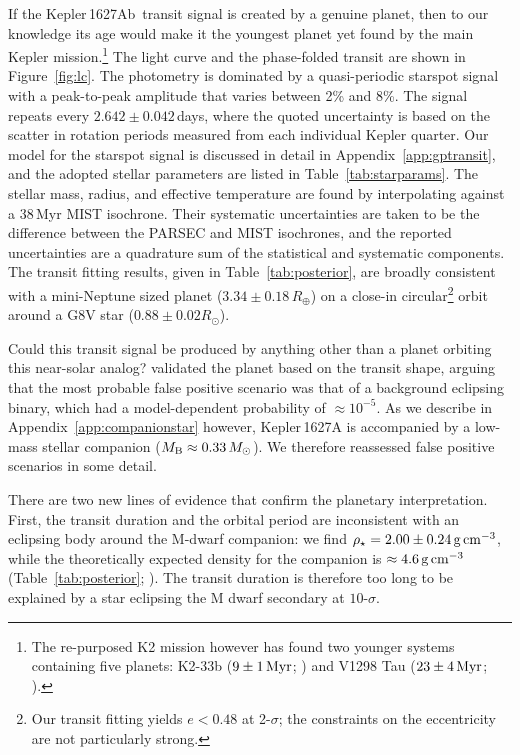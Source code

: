\documentclass[12pt,modern,twocolumn,tighten]{aastex63}
\newcommand{\pn}{Kepler\,1627Ab} %
\begin{document}
If the \pn\ transit signal is created by a genuine planet,  then to
our knowledge its age would make it the youngest planet yet found by
the main Kepler mission.\footnote{The re-purposed K2 mission however
has found two younger systems containing five planets: K2-33b
($9\pm1\,{\rm Myr}$; \citealt{Mann_K2_33b_2016,David_et_al_2017}) and
V1298 Tau ($23\pm4\,{\rm Myr}$; \citealt{david_four_2019}).}  The
light curve and the phase-folded transit are shown in
Figure~\ref{fig:lc}.  The photometry is dominated by a quasi-periodic
starspot signal with a peak-to-peak amplitude that varies between 2\%
and 8\%.  The signal repeats every $2.642\pm0.042$\,days, where the
quoted uncertainty is based on the scatter in rotation periods
measured from each individual Kepler quarter.  Our model for the
starspot signal is discussed in detail in
Appendix~\ref{app:gptransit}, and the adopted stellar parameters are
listed in Table~\ref{tab:starparams}.  The stellar mass, radius, and
effective temperature are found by interpolating against a 38$\,$Myr
MIST isochrone.  Their systematic uncertainties are taken to be the
difference between the PARSEC and MIST isochrones, and the reported
uncertainties are a quadrature sum of the statistical and systematic
components.  The transit fitting results, given in
Table~\ref{tab:posterior}, are broadly consistent with a mini-Neptune
sized planet ($3.34\pm 0.18\,R_\oplus$) on a close-in
circular\footnote{Our transit fitting yields $e<0.48$ at 2-$\sigma$;
the constraints on the eccentricity are not particularly strong.}
orbit around a G8V star
($0.88 \pm 0.02 R_\odot$).

Could this transit signal be produced by anything other than a planet
orbiting this near-solar analog?  \citet{morton_false_2016} validated
the planet based on the transit shape, arguing that the most probable
false positive scenario was that of a background eclipsing binary,
which had a model-dependent probability of $\approx10^{-5}$.  As we
describe in Appendix~\ref{app:companionstar} however, Kepler\,1627A is
accompanied by a low-mass stellar companion ($M_{\rm B}\approx
0.33\,M_\odot$).  We therefore reassessed false positive
scenarios in some detail. 

% 


There are two new lines of evidence that confirm the planetary
interpretation.  First, the transit duration and the orbital period
are inconsistent with an eclipsing body around the M-dwarf companion:
we find $\rho_\star = 2.00 \pm 0.24\,{\rm g\,cm}^{-3}$, while the
theoretically expected density for the companion is $\approx 4.6\,{\rm
g\,cm}^{-3}$ (Table~\ref{tab:posterior}; \citealt{choi_mesa_2016}).
The transit duration is therefore too long to be explained by a star
eclipsing the M dwarf secondary at $10$-$\sigma$.
\end{document}
